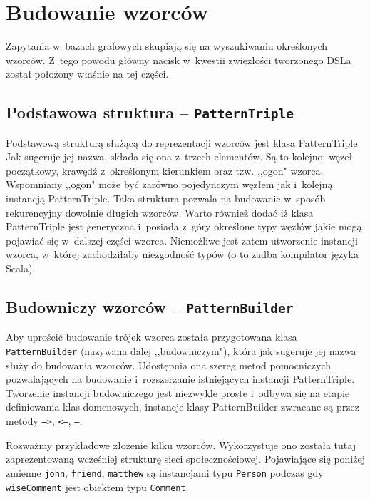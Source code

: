 \documentclass[brudnopis]{xmgr}
\begin{document}
\inputminted{scala}{listings/scala/dsl/sample-model.scala}

\section{Budowanie wzorców}

Zapytania w~bazach grafowych skupiają się na wyszukiwaniu określonych wzorców. Z~tego powodu główny nacisk w~kwestii zwięzłości tworzonego DSLa został położony właśnie na tej części.

\subsection{Podstawowa struktura -- \texttt{PatternTriple}}
Podstawową strukturą służącą do reprezentacji wzorców jest klasa PatternTriple. Jak sugeruje jej nazwa, składa się ona z~trzech elementów. Są to kolejno: węzeł początkowy, krawędź z~określonym kierunkiem oraz tzw. ,,ogon" wzorca. Wspomniany ,,ogon" może być zarówno pojedynczym węzłem jak i~kolejną instancją PatternTriple. Taka struktura pozwala na budowanie w~sposób rekurencyjny dowolnie długich wzorców. Warto również dodać iż klasa PatternTriple jest generyczna i~posiada z~góry określone typy węzłów jakie mogą pojawiać się w~dalszej części wzorca. Niemożliwe jest zatem utworzenie instancji wzorca, w~której zachodziłaby niezgodność typów (o to zadba kompilator języka Scala).

\subsection{Budowniczy wzorców -- \texttt{PatternBuilder}}
Aby uprościć budowanie trójek wzorca została przygotowana klasa \texttt{PatternBuilder} (nazywana dalej ,,budowniczym"), która jak sugeruje jej nazwa służy do budowania wzorców. Udostępnia ona szereg metod pomocniczych pozwalających na budowanie i~rozszerzanie istniejących instancji PatternTriple. Tworzenie instancji budowniczego jest niezwykle proste i~odbywa się na etapie definiowania klas domenowych, instancje klasy PatternBuilder zwracane są przez metody \texttt{-->}, \texttt{<--}, \texttt{--}.

Rozważmy przykładowe złożenie kilku wzorców. Wykorzystuje ono została tutaj zaprezentowaną wcześniej strukturę sieci społecznościowej. Pojawiające się poniżej zmienne \texttt{john}, \texttt{friend}, \texttt{matthew} są instancjami typu \texttt{Person} podczas gdy \texttt{wiseComment} jest obiektem typu \texttt{Comment}.
\end{document}
